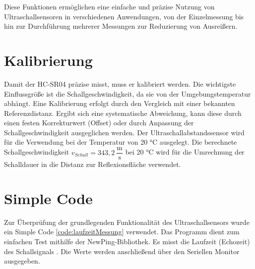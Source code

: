 Diese Funktionen ermöglichen eine einfache und präzise Nutzung von Ultraschallsensoren in verschiedenen Anwendungen, von der Einzelmessung bis hin zur Durchführung mehrerer Messungen zur Reduzierung von Ausreißern.


\section{Kalibrierung}
Damit der HC-SR04 präzise misst, muss er kalibriert werden. Die wichtigste Einflussgröße ist die
Schallgeschwindigkeit, da sie von der Umgebungstemperatur abhängt. Eine Kalibrierung erfolgt
durch den Vergleich mit einer bekannten Referenzdistanz. Ergibt sich eine systematische
Abweichung, kann diese durch einen festen Korrekturwert (Offset) oder durch Anpassung der
Schallgeschwindigkeit ausgeglichen werden. \cite{Traenkler:2014}
Der Ultraschallabstandssensor wird für die Verwendung bei der Temperatur von 20 °C ausgelegt. Die  berechnete Schallgeschwindigkeit $v_{Schall}=343,2\:\dfrac{\text{m}}{\text{s}}$ bei 20 °C wird für die Umrechnung der Schalldauer in die Distanz zur Reflexionsfläche verwendet.

\section{Simple Code}
Zur Überprüfung der grundlegenden Funktionalität des Ultraschallsensors wurde ein Simple Code \ref{code:laufzeitMessung} verwendet. Das Programm dient zum einfachen Test mithilfe der NewPing-Bibliothek. Es misst die Laufzeit (Echozeit) des Schallsignals	. Die Werte werden anschließend über den Seriellen Monitor ausgegeben.

\begin{code}
	\caption{Einfacher Code zum Testen des Ultraschallsensors}
	\label{code:laufzeitMessung}
\end{code}




